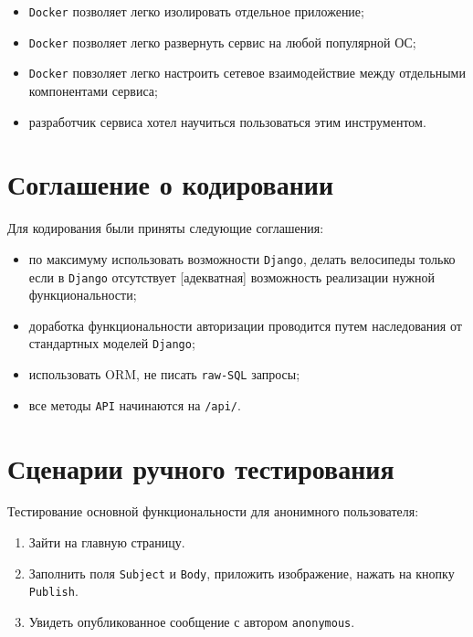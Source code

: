 \documentclass[oneside, final, 14pt]{extarticle}
\begin{document}
\begin{itemize}
\item{\texttt{Docker} позволяет легко изолировать отдельное приложение;}
\item{\texttt{Docker} позволяет легко развернуть сервис на любой популярной ОС;}
\item{\texttt{Docker} повзоляет легко настроить сетевое взаимодействие между отдельными компонентами сервиса;}
\item{разработчик сервиса хотел научиться пользоваться этим инструментом.}
\end{itemize}

\section{Соглашение о кодировании}

Для кодирования были приняты следующие соглашения:

\begin{itemize}
\item{по максимуму использовать возможности \texttt{Django}, делать велосипеды только если в \texttt{Django} отсутствует [адекватная] возможность реализации нужной функциональности;}
\item{доработка функциональности авторизации проводится путем наследования от стандартных моделей \texttt{Django};}
\item{использовать ORM, не писать \texttt{raw-SQL} запросы;}
\item{все методы \texttt{API} начинаются на \texttt{/api/}.}
\end{itemize}

\section{Сценарии ручного тестирования}

Тестирование основной функциональности для анонимного пользователя:

\begin{enumerate}
\item{Зайти на главную страницу.}
\item{Заполнить поля \texttt{Subject} и \texttt{Body}, приложить изображение, нажать на кнопку \texttt{Publish}.}
\item{Увидеть опубликованное сообщение с автором \texttt{anonymous}.}
\end{enumerate}

\vspace{0.5cm}
\end{document}
